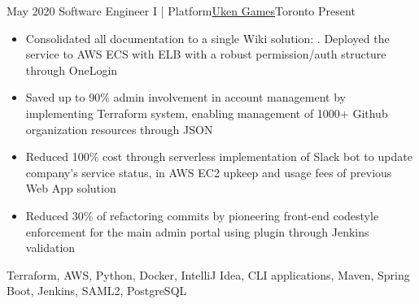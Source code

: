 %
%
%
\begin{experiences}
  \experience
    {May 2020}   {Software Engineer I | Platform}{\href{https://uken.com}{Uken Games}}{Toronto}
    {Present} {
                    \begin{itemize}
                        \item Consolidated all documentation to a single Wiki solution: . Deployed the service to AWS ECS with ELB with a robust permission/auth structure through OneLogin 
                        
                        \item Saved up to 90\% admin involvement in account management by implementing Terraform system, enabling management of 1000+ Github organization resources through JSON
                        
                        \item Reduced 100\% cost through serverless implementation of Slack bot to update company's service status, in AWS EC2 upkeep and usage fees of previous Web App solution
                        
                        \item Reduced 30\% of refactoring commits by pioneering front-end codestyle enforcement for the main admin portal using   plugin through Jenkins validation
                    \end{itemize}
                    }
                    {Terraform, AWS, Python, Docker, IntelliJ Idea, CLI applications, Maven, Spring Boot, Jenkins, SAML2, PostgreSQL}
\end{experiences}

